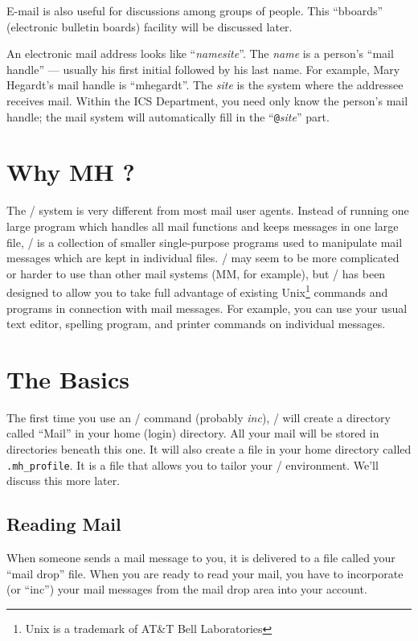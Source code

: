 E-mail is also useful for discussions among groups of people.  This
``bboards'' (electronic bulletin boards) facility will be discussed later.

An electronic mail address looks like ``{\it name\/}{\tt@}{\it site\/}''.
The {\it name\/} is
a person's ``mail handle'' --- usually his first initial followed by his
last name.   For example, Mary Hegardt's mail handle is ``mhegardt''.
The {\it site\/} is the system where the addressee receives mail.  Within
the ICS Department, you need only know the person's mail handle;
the mail system will automatically fill in the ``{\tt @}{\it site\/}'' part.

\section{Why MH ?}

The \MH/ system is very different from most mail user agents.  Instead of 
running one large program which handles all mail functions and keeps
messages in one large file, \MH/ is a collection of smaller 
single-purpose programs used to manipulate mail messages
which are kept in individual files.  \MH/ may seem to be more complicated
or harder to use than other mail systems (MM, for example), but  
\MH/ has been designed to allow
you to take full advantage of existing {\sc Unix}\footnote{{\sc Unix} is 
a trademark of AT\&T Bell Laboratories} commands and programs
in connection with mail messages.
For example, you can use your usual text editor, spelling program, and
printer commands on individual messages.  


\section{The Basics}

The first time you use an \MH/ command (probably {\it inc\/}), 
\MH/ will create a directory called ``Mail'' in your home (login) directory. All
your mail will be stored in directories beneath this one.  It will also
create a file in your home directory called \verb|.mh_profile|.  It is
a file that allows you to tailor your \MH/ environment.  We'll discuss
this more later.  


\subsection{Reading Mail}

When someone sends a mail message to you, it is delivered to a file
called your ``mail drop'' file.  When you are ready to read your mail,
you have to incorporate (or ``inc'') your mail messages from the mail
drop area into your account.


